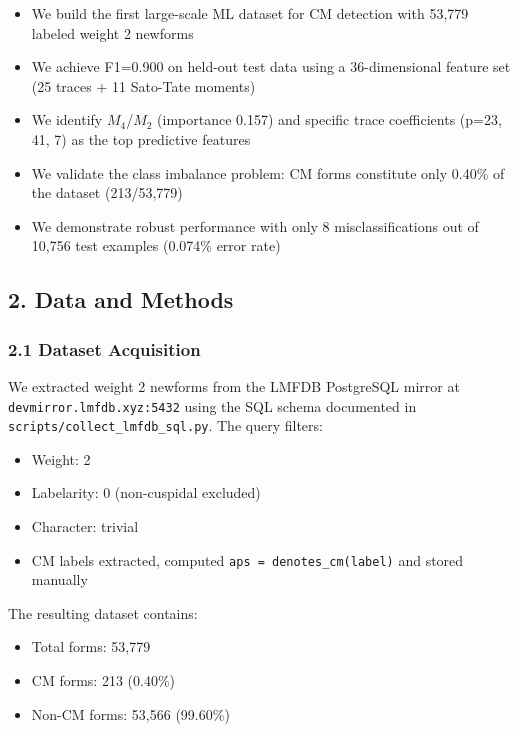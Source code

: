 \documentclass[
]{article}
\providecommand{\tightlist}{%
  \setlength{\itemsep}{0pt}\setlength{\parskip}{0pt}}
\begin{document}
\begin{itemize}
\tightlist
\item
  We build the first large-scale ML dataset for CM detection with 53,779
  labeled weight 2 newforms
\item
  We achieve F1=0.900 on held-out test data using a 36-dimensional
  feature set (25 traces + 11 Sato-Tate moments)
\item
  We identify $M_4$/$M_2$ (importance 0.157) and specific trace coefficients
  (p=23, 41, 7) as the top predictive features
\item
  We validate the class imbalance problem: CM forms constitute only
  0.40\% of the dataset (213/53,779)
\item
  We demonstrate robust performance with only 8 misclassifications out
  of 10,756 test examples (0.074\% error rate)
\end{itemize}

\hypertarget{data-and-methods}{%
\subsection{2. Data and Methods}\label{data-and-methods}}

\hypertarget{dataset-acquisition}{%
\subsubsection{2.1 Dataset Acquisition}\label{dataset-acquisition}}

We extracted weight 2 newforms from the LMFDB PostgreSQL mirror at
\texttt{devmirror.lmfdb.xyz:5432} using the SQL schema documented in
\texttt{scripts/collect\_lmfdb\_sql.py}. The query filters:

\begin{itemize}
\tightlist
\item
  Weight: 2
\item
  Labelarity: 0 (non-cuspidal excluded)
\item
  Character: trivial
\item
  CM labels extracted, computed \texttt{aps\ =\ denotes\_cm(label)} and
  stored manually
\end{itemize}

The resulting dataset contains:

\begin{itemize}
\tightlist
\item
  Total forms: 53,779
\item
  CM forms: 213 (0.40\%)
\item
  Non-CM forms: 53,566 (99.60\%)
\end{itemize}
\end{document}
